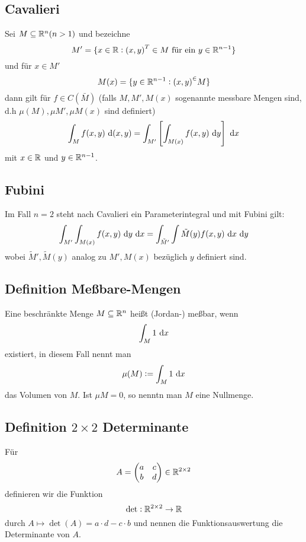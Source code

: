 \subsection{Cavalieri}
Sei $M \subseteq \mathbb{R}^n (n >1)$ und bezeichne
\begin{equation*}
    M' = \{ x \in \mathbb{R}: {(x,y)}^T \in M \text{ für ein } y \in \mathbb{R}^{n-1} \}
\end{equation*}
und für $x \in M'$
\begin{equation*}
    M(x) = \{ y \in \mathbb{R}^{n-1}: {(x,y)}^ \in M \}
\end{equation*}
dann gilt für $f \in C(\bar{M})$ (falls $M, M', M(x)$ sogenannte messbare Mengen
sind, d.h $\mu(M), \mu{M'}, \mu{M(x)}$ sind definiert)
\begin{equation*}
    \int_M f(x,y) \text{ d}(x,y) = \int_{M'} \left[ \int_{M(x)} f(x,y) \text{ d}y \right]
        \text{ d}x
\end{equation*}
mit $x \in \mathbb{R}$ und $y \in \mathbb{R}^{n-1}$.

\subsection{Fubini}
Im Fall $n=2$ steht nach Cavalieri ein Parameterintegral und mit Fubini gilt:
\begin{equation*}
    \int_{M'} \int_{M(x)} f(x,y) \text{ d}y \text{ d}x =
    \int_{\tilde{M}'} \int{\tilde{M}(y)} f(x,y) \text{ d}x \text{ d}y
\end{equation*}
wobei $\tilde{M}', \tilde{M}(y)$ analog zu $M', M(x)$ bezüglich $y$ definiert
sind.

\subsection{Definition Meßbare-Mengen}
Eine beschränkte Menge $M \subseteq \mathbb{R}^n$ heißt (Jordan-) meßbar, wenn
\begin{equation*}
    \int_M 1 \text{ d}x
\end{equation*}
existiert, in diesem Fall nennt man
\begin{equation*}
    \mu(M) := \int_M 1 \text{ d}x
\end{equation*}
das Volumen von $M$. Ist $\mu{M} =0$, so nenntn man $M$ eine Nullmenge.

\subsection{Definition $2 \times 2$ Determinante}
Für
\begin{equation*}
    A =
    \begin{pmatrix}
        a & c \\
        b & d \\
    \end{pmatrix}
    \in \mathbb{R}^{2 \times 2}
\end{equation*}
definieren wir die Funktion
\begin{equation*}
    \det: \mathbb{R}^{2 \times 2} \to \mathbb{R}
\end{equation*}
durch $A \mapsto \det(A) = a \cdot d -  c \cdot b$ und nennen die
Funktionsauswertung die Determinante von $A$.

